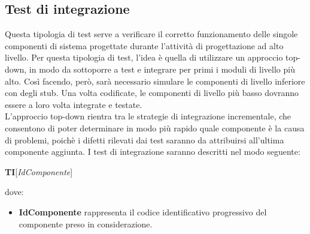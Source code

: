 	\subsection{Test di integrazione}
	Questa tipologia di test serve a verificare il corretto funzionamento delle singole componenti di sistema progettate durante l'attività di progettazione ad alto livello. Per questa tipologia di test, l'idea è quella di utilizzare un approccio top-down, in modo da sottoporre a test e integrare per primi i moduli di livello più alto.
	Così facendo, però, sarà necessario simulare le componenti di livello inferiore con degli stub. Una volta codificate, le componenti di livello più basso dovranno essere a loro volta integrate e testate.\\
	L'approccio top-down rientra tra le strategie di integrazione incrementale, che consentono di poter determinare in modo più rapido quale componente è la causa di problemi, poichè i difetti rilevati dai test saranno da attribuirsi all'ultima componente aggiunta.
	I test di integrazione saranno descritti nel modo seguente:
	\begin{center}
		\textbf{TI}[\textit{IdComponente}]
	\end{center}
	dove:
	\begin{itemize}
		\item
		\textbf{IdComponente} rappresenta il codice identificativo progressivo del componente preso in considerazione.
	\end{itemize}
	
